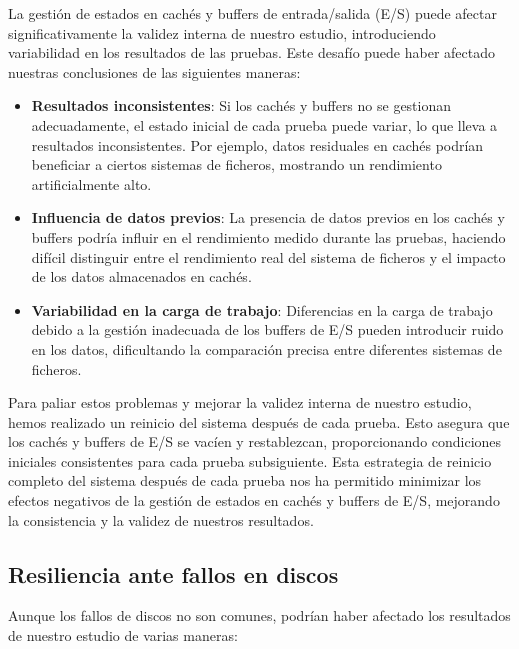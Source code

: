 La gestión de estados en cachés y buffers de entrada/salida (E/S) puede afectar significativamente la validez interna de nuestro estudio, introduciendo variabilidad en los resultados de las pruebas. Este desafío puede haber afectado nuestras conclusiones de las siguientes maneras:

\begin{itemize}
    \item \textbf{Resultados inconsistentes}: Si los cachés y buffers no se gestionan adecuadamente, el estado inicial de cada prueba puede variar, lo que lleva a resultados inconsistentes. Por ejemplo, datos residuales en cachés podrían beneficiar a ciertos sistemas de ficheros, mostrando un rendimiento artificialmente alto.
    \item \textbf{Influencia de datos previos}: La presencia de datos previos en los cachés y buffers podría influir en el rendimiento medido durante las pruebas, haciendo difícil distinguir entre el rendimiento real del sistema de ficheros y el impacto de los datos almacenados en cachés.
    \item \textbf{Variabilidad en la carga de trabajo}: Diferencias en la carga de trabajo debido a la gestión inadecuada de los buffers de E/S pueden introducir ruido en los datos, dificultando la comparación precisa entre diferentes sistemas de ficheros.
\end{itemize}

Para paliar estos problemas y mejorar la validez interna de nuestro estudio, hemos realizado un reinicio del sistema después de cada prueba. Esto asegura que los cachés y buffers de E/S se vacíen y restablezcan, proporcionando condiciones iniciales consistentes para cada prueba subsiguiente. Esta estrategia de reinicio completo del sistema después de cada prueba nos ha permitido minimizar los efectos negativos de la gestión de estados en cachés y buffers de E/S, mejorando la consistencia y la validez de nuestros resultados.

\subsection{Resiliencia ante fallos en discos}

Aunque los fallos de discos no son comunes, podrían haber afectado los resultados de nuestro estudio de varias maneras:

